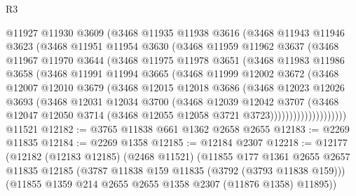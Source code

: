 \begin{lexlean}{R3}
\begin{coremodule}
            @11927
            @11930
            @3609
            (@3468
              @11935
              @11938
              @3616
              (@3468
                @11943
                @11946
                @3623
                (@3468
                  @11951
                  @11954
                  @3630
                  (@3468
                    @11959
                    @11962
                    @3637
                    (@3468
                      @11967
                      @11970
                      @3644
                      (@3468
                        @11975
                        @11978
                        @3651
                        (@3468
                          @11983
                          @11986
                          @3658
                          (@3468
                            @11991
                            @11994
                            @3665
                            (@3468
                              @11999
                              @12002
                              @3672
                              (@3468
                                @12007
                                @12010
                                @3679
                                (@3468
                                  @12015
                                  @12018
                                  @3686
                                  (@3468
                                    @12023
                                    @12026
                                    @3693
                                    (@3468
                                      @12031
                                      @12034
                                      @3700
                                      (@3468
                                        @12039
                                        @12042
                                        @3707
                                        (@3468
                                          @12047
                                          @12050
                                          @3714
                                          (@3468 @12055 @12058 @3721 @3723))))))))))))))))))))
    @11521
@12182 := @3765 @11838 @661 @1362 @2658 @2655
@12183 := @2269 @11835
@12184 := @2269 @1358
@12185 := @12184 @2307
@12218 := @12177
    (@12182
      (@12183 @12185)
      (@2468 @11521)
      (@11855
        @177
        @1361
        @2655
        @2657
        @11835
        @12185
        (@3787 @11838 @159 @11835 (@3792 (@3793 @11838 @159)))
        (@11855 @1359 @214 @2655 @2655 @1358 @2307 (@11876 @1358) @11895))

\end{coremodule}
\end{lexlean}
